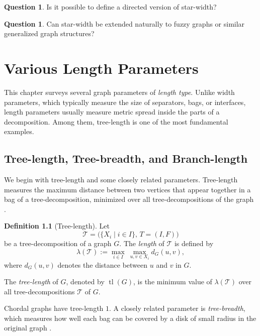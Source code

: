 \documentclass[10pt]{book}
\theoremstyle{definition}
\newtheorem{definition}[theorem]{Definition}
\newtheorem{question}[theorem]{Question}
\DeclareMathOperator{\tl}{tl}
\begin{document}
\begin{question}
Is it possible to define a directed version of star-width?
\end{question}

\begin{question}
Can star-width be extended naturally to fuzzy graphs or similar generalized graph structures?
\end{question}

\newpage
  
\chapter{Various Length Parameters}

This chapter surveys several graph parameters of \emph{length type}.  
Unlike width parameters, which typically measure the size of separators, bags, or interfaces, length parameters usually measure metric spread inside the parts of a decomposition.  
Among them, tree-length is one of the most fundamental examples.

\section{Tree-length, Tree-breadth, and Branch-length}
We begin with tree-length and some closely related parameters.  
Tree-length measures the maximum distance between two vertices that appear together in a bag of a tree-decomposition, minimized over all tree-decompositions of the graph \cite{coudert2016approximate,dourisboure2004compact,
dourisboure2007spanners}.

\begin{definition}[Tree-length]
\cite{coudert2016approximate,dourisboure2004compact,
dourisboure2007spanners}
Let
\[
\mathcal{T}=\bigl(\{X_i\mid i\in I\},\,T=(I,F)\bigr)
\]
be a tree-decomposition of a graph \(G\).  
The \emph{length} of \(\mathcal{T}\) is defined by
\[
\lambda(\mathcal{T})
:=
\max_{i\in I}\ \max_{u,v\in X_i} d_G(u,v),
\]
where \(d_G(u,v)\) denotes the distance between \(u\) and \(v\) in \(G\).

The \emph{tree-length} of \(G\), denoted by \(\tl(G)\), is the minimum value of \(\lambda(\mathcal{T})\) over all tree-decompositions \(\mathcal{T}\) of \(G\).
\end{definition}

Chordal graphs have tree-length \(1\).
A closely related parameter is \emph{tree-breadth}, which measures how well each bag can be covered by a disk of small radius in the original graph \cite{leitert2016strong,leitert2017tree}.
\end{document}
